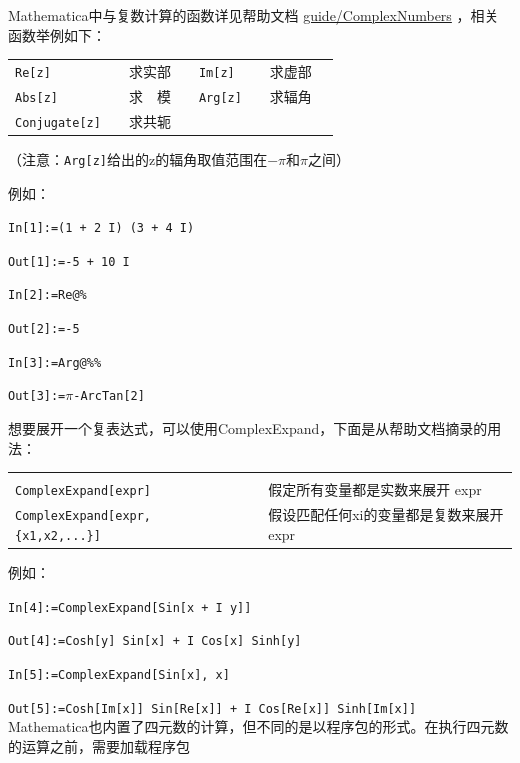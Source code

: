 \documentclass[UTF8,a4paper,10pt]{ctexart}
\newcommand{\mma}{Mathematica}
\begin{document}
Mathematica中与复数计算的函数详见帮助文档
\href{http://reference.wolfram.com/language/guide/ComplexNumbers.html}{guide/ComplexNumbers}
，相关函数举例如下：
\noindent
\begin{center}
\begin{tabular}{llll|llll}
\hline\hline\hline
\;\verb-Re[z]- & & {\;}求实部 & \qquad  &
\;\verb-Im[z]- & & {\;}求虚部 & \qquad \\
\:\verb-Abs[z]- & & {\;}求　模 & \qquad &
\;\verb-Arg[z]- & & {\;}求辐角 \\
\;\verb-Conjugate[z]- & & {\;}求共轭 & \qquad &
& & & \qquad \\
\hline\hline\hline
\end{tabular}
\end{center}
（注意：\verb|Arg[z]|给出的z的辐角取值范围在$-\pi$和$\pi$之间）

例如：

\verb|In[1]:=(1 + 2 I) (3 + 4 I)|

\verb|Out[1]:=-5 + 10 I|

\verb|In[2]:=Re@%|

\verb|Out[2]:=-5|

\verb|In[3]:=Arg@%%|

\verb|Out[3]:=|$\pi$\verb|-ArcTan[2]|

想要展开一个复表达式，可以使用ComplexExpand，下面是从帮助文档摘录的用法：

\noindent
\begin{center}
\begin{tabular}{p{6cm}l|lp{7cm}}
\hline\hline\hline
& & & \\[-13pt]
\verb+ComplexExpand[expr]+                    & \qquad & & 假定所有变量都是实数来展开 expr\\[-0.20pt]
\verb-ComplexExpand[expr,{x1,x2,...}]-        & \qquad & & 假设匹配任何xi的变量都是复数来展开 expr \\[-0.20pt]
\hline\hline\hline
\end{tabular}
\end{center}

例如：

\verb|In[4]:=ComplexExpand[Sin[x + I y]]|

\verb|Out[4]:=Cosh[y] Sin[x] + I Cos[x] Sinh[y]|

\verb|In[5]:=ComplexExpand[Sin[x], x]|

\verb|Out[5]:=Cosh[Im[x]] Sin[Re[x]] + I Cos[Re[x]] Sinh[Im[x]]|
\\

\mma 也内置了四元数的计算，但不同的是以程序包的形式。在执行四元数的运算之前，需要加载程序包
\end{document}
